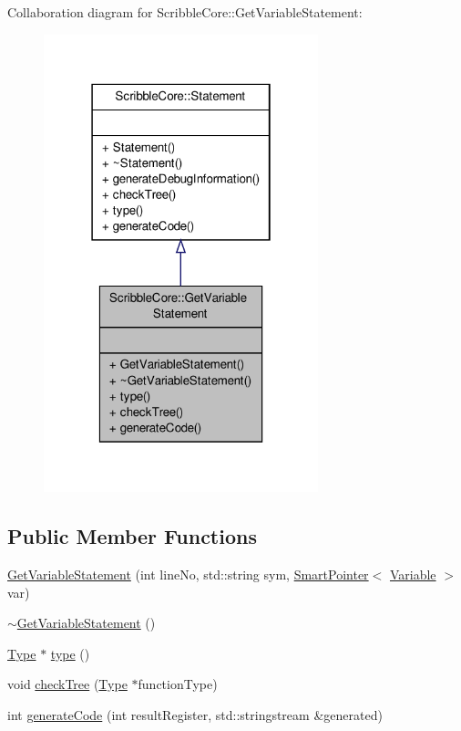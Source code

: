 Collaboration diagram for Scribble\-Core\-:\-:Get\-Variable\-Statement\-:
\nopagebreak
\begin{figure}[H]
\begin{center}
\leavevmode
\includegraphics[width=226pt]{class_scribble_core_1_1_get_variable_statement__coll__graph}
\end{center}
\end{figure}
\subsection*{Public Member Functions}
\begin{DoxyCompactItemize}
\item 
\hyperlink{class_scribble_core_1_1_get_variable_statement_a2dd1671cca524e106bfa0ee6f6066aee}{Get\-Variable\-Statement} (int line\-No, std\-::string sym, \hyperlink{_smart_pointer_8hpp_afdd8d4ba81c3fcbdeacf1dafba2accfb}{Smart\-Pointer}$<$ \hyperlink{class_scribble_core_1_1_variable}{Variable} $>$ var)
\item 
\hyperlink{class_scribble_core_1_1_get_variable_statement_aa3d16c305e77a385f38f5ffd2ac9ae97}{$\sim$\-Get\-Variable\-Statement} ()
\item 
\hyperlink{class_scribble_core_1_1_type}{Type} $\ast$ \hyperlink{class_scribble_core_1_1_get_variable_statement_ad2b6ae50fac383c27217c6660c9826dc}{type} ()
\item 
void \hyperlink{class_scribble_core_1_1_get_variable_statement_ade323d3f4af74fb2b94e077afaa7aadd}{check\-Tree} (\hyperlink{class_scribble_core_1_1_type}{Type} $\ast$function\-Type)
\item 
int \hyperlink{class_scribble_core_1_1_get_variable_statement_ad4951a090b1ba4209c0ec310a9f7f48b}{generate\-Code} (int result\-Register, std\-::stringstream \&generated)
\end{DoxyCompactItemize}


